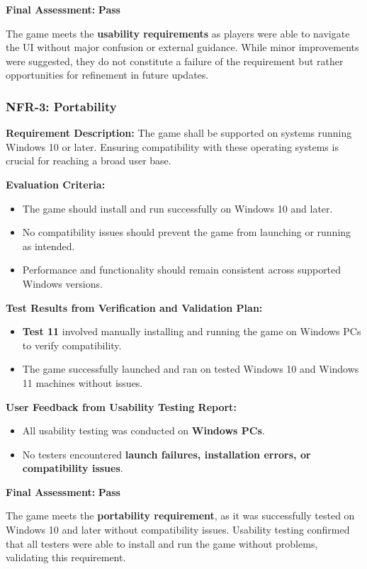 \documentclass[12pt, titlepage]{article}
\begin{document}
\textbf{Final Assessment:} \textbf{Pass}  

The game meets the \textbf{usability requirements} as players were able to navigate the UI without major confusion or external guidance. While minor improvements were suggested, they do not constitute a failure of the requirement but rather opportunities for refinement in future updates.


\subsubsection{NFR-3: Portability}
\label{NFR3}

\textbf{Requirement Description:}  
The game shall be supported on systems running Windows 10 or later. Ensuring compatibility with these operating systems is crucial for reaching a broad user base.

\textbf{Evaluation Criteria:}  
\begin{itemize}
    \item The game should install and run successfully on Windows 10 and later.
    \item No compatibility issues should prevent the game from launching or running as intended.
    \item Performance and functionality should remain consistent across supported Windows versions.
\end{itemize}

\textbf{Test Results from Verification and Validation Plan:}  
\begin{itemize}
    \item \textbf{Test 11} involved manually installing and running the game on Windows PCs to verify compatibility.
    \item The game successfully launched and ran on tested Windows 10 and Windows 11 machines without issues.
\end{itemize}

\textbf{User Feedback from Usability Testing Report:}  
\begin{itemize}
    \item All usability testing was conducted on \textbf{Windows PCs}.
    \item No testers encountered \textbf{launch failures, installation errors, or compatibility issues}.
\end{itemize}

\textbf{Final Assessment:} \textbf{Pass}  

The game meets the \textbf{portability requirement}, as it was successfully tested on Windows 10 and later without compatibility issues. Usability testing confirmed that all testers were able to install and run the game without problems, validating this requirement.
\end{document}
